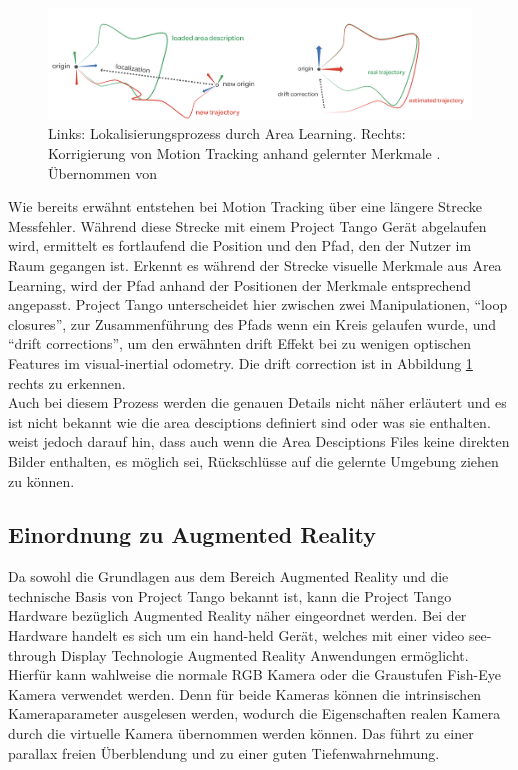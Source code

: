 \begin{figure}[h]
  \centering
	\includegraphics[width=1.0\textwidth]{content/images/theory/tango-area-learning.png} 
  \caption{Links: Lokalisierungsprozess durch Area Learning. Rechts: Korrigierung von Motion Tracking anhand gelernter Merkmale . Übernommen von \citet{GoogleDevelopers:online}}
  \label{fig:area-learning}
\end{figure}

Wie bereits erwähnt entstehen bei Motion Tracking über eine längere Strecke Messfehler. 
Während diese Strecke mit einem Project Tango Gerät abgelaufen wird, ermittelt es fortlaufend die Position und den Pfad, den der Nutzer im Raum gegangen ist. 
Erkennt es während der Strecke visuelle Merkmale aus Area Learning, wird der Pfad anhand der Positionen der Merkmale entsprechend angepasst. 
Project Tango unterscheidet hier zwischen zwei Manipulationen, \enquote{loop closures}, zur Zusammenführung des Pfads wenn ein Kreis gelaufen wurde, und \enquote{drift corrections}, um den erwähnten drift Effekt bei zu wenigen optischen Features im visual-inertial odometry. 
Die drift correction ist in Abbildung \ref{fig:area-learning} rechts zu erkennen. \citep{GoogleDevelopersConcepts:online} \\

Auch bei diesem Prozess werden die genauen Details nicht näher erläutert und es ist nicht bekannt wie die area desciptions definiert sind oder was sie enthalten. \citep{GoogleDevelopersConcepts:online} weist jedoch darauf hin, dass auch wenn die Area Desciptions Files keine direkten Bilder enthalten, es möglich sei, Rückschlüsse auf die gelernte Umgebung ziehen zu können. \\

\subsection{Einordnung zu Augmented Reality} \label{sec:classification_project_tango}

Da sowohl die Grundlagen aus dem Bereich Augmented Reality und die technische Basis von Project Tango bekannt ist, kann die Project Tango Hardware bezüglich Augmented Reality näher eingeordnet werden. Bei der Hardware handelt es sich um ein hand-held Gerät, welches mit einer video see-through Display Technologie Augmented Reality Anwendungen ermöglicht. Hierfür kann wahlweise die normale RGB Kamera oder die Graustufen Fish-Eye Kamera verwendet werden. Denn für beide Kameras können die intrinsischen Kameraparameter ausgelesen werden, wodurch die Eigenschaften realen Kamera durch die virtuelle Kamera übernommen werden können. Das führt zu einer parallax freien Überblendung und zu einer guten Tiefenwahrnehmung. \\

